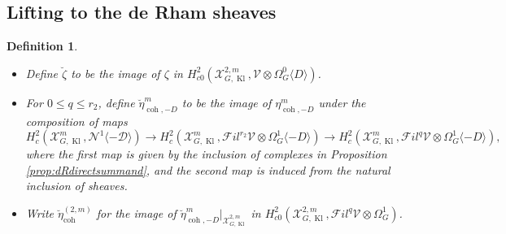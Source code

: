 \documentclass[cjm]{ipart}
\theoremstyle{plain}
\newtheorem{proposition}[theorem]{Proposition}
\newtheorem{definition}[theorem]{Definition}
\theoremstyle{remark}
\DeclareMathOperator{\coh}{coh}
\DeclareMathOperator{\Kl}{Kl}
\newcommand{\Pif}{\Pi_{\mathrm{f}}}
\newcommand{\cD}{\mathcal{D}}
\newcommand{\cN}{\mathcal{N}}
\newcommand{\cV}{\mathcal{V}}
\newcommand{\cX}{\mathcal{X}}
\newcommand{\sFil}{{\mathscr Fil}}
\numberwithin{equation}{subsection}
\renewcommand{\leq}{\leqslant}
\begin{document}
%
%
%



 \subsection{Lifting to the de Rham sheaves}
  \label{sect:dRsheaves}

  \begin{definition} \
   \begin{itemize}
    \item Define $\breve{\zeta}$ to be the image of $\zeta$ in $H^2_{c0}(\cX_{G,\Kl}^{2,m}, \cV\otimes\Omega_G^0 \langle D \rangle)$.
    \item For $0\leq q\leq r_2$, define $\breve{\eta}^m_{\coh,-D}$ to be the image of $\eta^m_{\coh,-D}$ under the composition of maps
    \[  
     H^2_{c}(\cX_{G,\Kl}^m, \cN^1\langle -\cD\rangle) \to
     H^2_{c}(\cX_{G,\Kl}^m, \sFil^{r_2}\cV\otimes\Omega_G^1\langle -D \rangle) \to
     H^2_{c}(\cX_{G,\Kl}^m, \sFil^{q}\cV\otimes\Omega_G^1\langle -D \rangle),
    \]
    where the first map is given by the inclusion of complexes in Proposition \ref{prop:dRdirectsummand}, and the second map is induced from the natural inclusion of sheaves.
    \item Write $\breve{\eta}^{(2,m)}_{\coh}$ for the image of $\breve{\eta}^m_{\coh,-D}|_{\cX^{2,m}_{G,\Kl}}$ in $H^2_{c0}(\cX_{G,\Kl}^{2,m}, \sFil^{q}\cV\otimes\Omega_G^1)$.
    \end{itemize}
  \end{definition}
\end{document}
